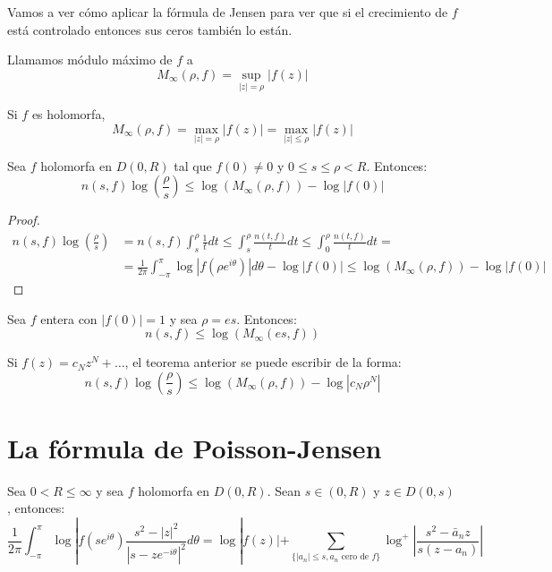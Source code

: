 Vamos a ver cómo aplicar la fórmula de Jensen para ver que si el crecimiento de $f$ está controlado entonces sus ceros también lo están.

\begin{definition}
    Llamamos módulo máximo de $f$ a
    $$M_\infty(\rho, f) = \sup_{|z|=\rho} |f(z)|$$
\end{definition}

\begin{remark}
    Si $f$ es holomorfa,
    $$M_\infty(\rho, f) = \max_{|z|=\rho} |f(z)| = \max_{|z|\leq\rho} |f(z)|$$
\end{remark}

\begin{theorem}
    Sea $f$ holomorfa en $D(0, R)$ tal que $f(0) \neq 0$ y $0 \leq s \leq \rho < R$.
    Entonces:
    $$n(s, f)\log\left(\frac{\rho}{s}\right) \leq \log(M_\infty(\rho, f)) - \log|f(0)|$$
\end{theorem}

\begin{proof}
    \begin{align*}
        n(s, f)\log\left(\frac{\rho}{s}\right) & = n(s, f)\int_s^\rho \frac{1}{t}dt \leq \int_s^\rho \frac{n(t, f)}{t}dt \leq \int_0^\rho \frac{n(t, f)}{t}dt =           \\
                                               & = \frac{1}{2\pi} \int_{-\pi}^\pi \log|f(\rho e^{i\theta})|d\theta - \log|f(0)| \leq \log(M_\infty(\rho, f)) - \log|f(0)|
    \end{align*}
\end{proof}

\begin{example}
    Sea $f$ entera con $|f(0)| = 1$ y sea $\rho = es$.
    Entonces:
    $$n(s, f) \leq \log(M_\infty(es, f))$$
\end{example}

\begin{remark}
    Si $f(z) = c_Nz^N + \dots$, el teorema anterior se puede escribir de la forma:
    $$n(s, f)\log\left(\frac{\rho}{s}\right) \leq \log(M_\infty(\rho, f)) - \log|c_N\rho^N|$$
\end{remark}

\section{La fórmula de Poisson-Jensen}
\begin{theorem}
    Sea $0 < R \leq \infty$ y sea $f$ holomorfa en $D(0, R)$.
    Sean $s \in (0, R)$ y $z \in D(0, s)$, entonces:
    $$\frac{1}{2\pi} \int_{-\pi}^\pi \log|f(se^{i\theta})\frac{s^2-|z|^2}{|s-ze^{-i\theta}|^2}d\theta = \log|f(z)| + \sum_{\{|a_n| \leq s, a_n \text{ cero de } f\}} \log^+\left|\frac{s^2-\bar{a}_nz}{s(z-a_n)}\right|$$
\end{theorem}

